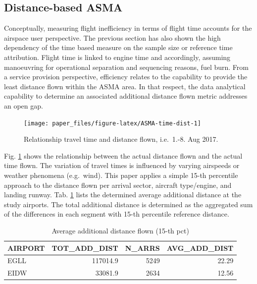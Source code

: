 \documentclass[conference,final,a4paper,]{IEEEtran}
\begin{document}
\hypertarget{distance-based-asma}{%
\subsection{Distance-based ASMA}\label{distance-based-asma}}

Conceptually, measuring flight inefficiency in terms of flight time accounts for the airspace user perspective.
The previous section has also shown the high dependency of the time based measure on the sample size or reference time attribution.
Flight time is linked to engine time and accordingly, assuming manoeuvring for operational separation and sequencing reasons, fuel burn.
From a service provision perspective, efficiency relates to the capability to provide the least distance flown within the ASMA area.
In that respect, the data analytical capability to determine an associated additional distance flown metric addresses an open gap.



\begin{figure}[hbt]

{\centering \texttt{[image: paper\_files/figure-latex/ASMA-time-dist-1]} 

}

\caption{Relationship travel time and distance flown, i.e.~1.-8. Aug 2017.}\label{fig:ASMA-time-dist}
\end{figure}

Fig. \ref{fig:ASMA-time-dist} shows the relationship between the actual distance flown and the actual time flown.
The variation of travel times is influenced by varying airspeeds or weather phenomena (e.g.~wind).
This paper applies a simple 15-th percentile approach to the distance flown per arrival sector, aircraft type/engine, and landing runway.
Tab. \ref{tab:tbl-asma-dist} lists the determined average additional distance at the study airports.
The total additional distance is determined as the aggregated sum of the differences in each segment
with 15-th percentile reference distance.

\begin{table}

\caption{\label{tab:tbl-asma-dist}Average additional distance flown (15-th pct)}
\centering
\begin{tabular}[t]{l|r|r|r}
\hline
AIRPORT & TOT\_ADD\_DIST & N\_ARRS & AVG\_ADD\_DIST\\
\hline
EGLL & 117014.9 & 5249 & 22.29\\
\hline
EIDW & 33081.9 & 2634 & 12.56\\
\hline
\end{tabular}
\end{table}
\end{document}
